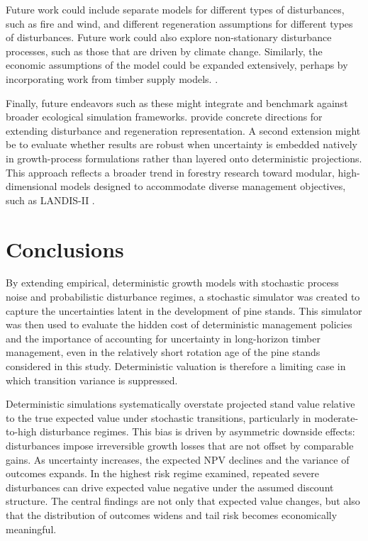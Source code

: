 \documentclass[12pt]{report}
\begin{document}
Future work could include separate models for different types of disturbances, such as fire and wind, and different 
regeneration assumptions for different types of disturbances. Future work could also explore non-stationary 
disturbance processes, such as those that are driven by climate change. Similarly, the economic assumptions of
the model could be expanded extensively, perhaps by incorporating work from timber supply models. \parencite{dasilvaAgentBasedInventoryManagement}.

Finally, future endeavors such as these might integrate and benchmark against broader ecological simulation frameworks. \textcite{pabstCalibratingTestingGap2008} 
provide concrete directions for extending disturbance and regeneration representation. 
A second extension might be to evaluate whether results are robust when uncertainty is embedded natively in growth-process 
formulations rather than layered onto deterministic projections. This approach reflects a broader trend in forestry research toward modular, high-dimensional models designed 
to accommodate diverse management objectives, such as LANDIS-II \parencite{scheller2004landis}. 

\chapter{Conclusions}

By extending empirical, deterministic growth models with stochastic process noise and probabilistic disturbance 
regimes, a stochastic simulator was created to capture the uncertainties latent in the development of pine stands. 
This simulator was then used to evaluate the hidden cost of deterministic management policies and the importance 
of accounting for uncertainty in long-horizon timber management, even in the relatively short rotation age of the 
pine stands considered in this study. Deterministic valuation is therefore a limiting case in which transition variance is 
suppressed.

Deterministic simulations systematically overstate projected stand value relative to the true expected value under 
stochastic transitions, particularly in moderate-to-high disturbance regimes. This bias is driven by asymmetric 
downside effects: disturbances impose irreversible growth losses that are not offset by comparable gains. As 
uncertainty increases, the expected NPV declines and the variance of outcomes expands. In the highest 
risk regime examined, repeated severe disturbances can drive expected value negative under the assumed 
discount structure. The central findings are not only that expected value changes, but also that the distribution of 
outcomes widens and tail risk becomes economically meaningful.
\end{document}
